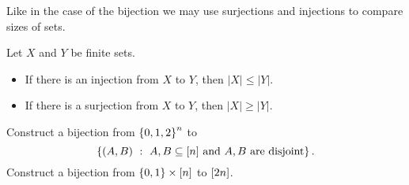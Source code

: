 Like in the case of the bijection we may use surjections and injections to
compare sizes of sets.
\begin{theorem}
\label{theorem:injections-surjections-inequalities}
    Let $X$ and $Y$ be finite sets.
    \begin{itemize}
        \item If there is an injection from $X$ to $Y$, then $|X| \le |Y|$.
        \item If there is a surjection from $X$ to $Y$, then $|X| \ge |Y|$.
    \end{itemize}
\end{theorem}

\begin{chapterendexercises}
    \exercise Construct a bijection from $\set{0, 1, 2}^n$ to
        \[
          \set[{A, B \subseteq \range{n} \text{ and } A, B \text{ are disjoint}}]{(A, B)}.
        \]
    \exercise[recommended] Construct a bijection from
        $\set{0, 1} \times \range{n}$ to ${[{2n}]}$.
\end{chapterendexercises}
